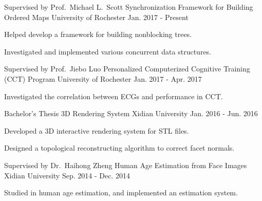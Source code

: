 \begin{cventries}
  \cventry
    {Supervised by Prof.\ Michael L.\ Scott} %
    {Synchronization Framework for Building Ordered Maps} %
    {University of Rochester} %
    {Jan. 2017 - Present} %
    {
      \begin{cvitems} %
        \item {Helped develop a framework for building nonblocking trees.}
        \item {Investigated and implemented various concurrent data structures.}
      \end{cvitems}
    }

  \cventry
    {Supervised by Prof.\ Jiebo Luo} %
    {Personalized Computerized Cognitive Training (CCT) Program} %
    {University of Rochester} %
    {Jan. 2017 - Apr. 2017} %
    {
      \begin{cvitems} %
        \item {Investigated the correlation between ECGs and performance in CCT.}
      \end{cvitems}
    }

  \cventry
    {Bachelor's Thesis} %
    {3D Rendering System} %
    {Xidian University} %
    {Jan. 2016 - Jun. 2016} %
    {
      \begin{cvitems} %
        \item {Developed a 3D interactive rendering system for STL files.}
        \item {Designed a topological reconstructing algorithm to correct facet normals.}
      \end{cvitems}
    }

  \cventry
    {Supervised by Dr.\ Haihong Zheng} %
    {Human Age Estimation from Face Images} %
    {Xidian University} %
    {Sep. 2014 - Dec. 2014} %
    {
      \begin{cvitems} %
        \item {Studied in human age estimation, and implemented an estimation system.}
      \end{cvitems}
    }

\end{cventries}
